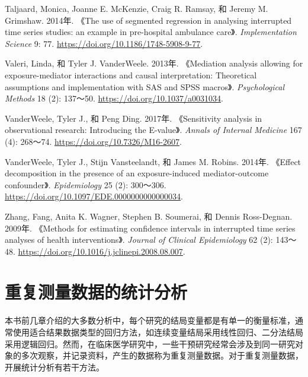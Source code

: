 \documentclass[
  chinese-hans,
  letterpaper,
  DIV=11,
  numbers=noendperiod]{scrreprt}
\newlength{\cslhangindent}
\newenvironment{CSLReferences}[2] %
 {\begin{list}{}{%
  \setlength{\itemindent}{0pt}
  \setlength{\leftmargin}{0pt}
  \setlength{\parsep}{0pt}
  \ifodd #1
   \setlength{\leftmargin}{\cslhangindent}
   \setlength{\itemindent}{-1\cslhangindent}
  \fi
  \setlength{\itemsep}{#2\baselineskip}}}
 {\end{list}}
\begin{document}
\begin{CSLReferences}{1}{1}
Taljaard, Monica, Joanne E. McKenzie, Craig R. Ramsay, 和 Jeremy M.
Grimshaw. 2014年. {《The use of segmented regression in analysing
interrupted time series studies: an example in pre-hospital ambulance
care》}. \emph{Implementation Science} 9: 77.
\url{https://doi.org/10.1186/1748-5908-9-77}.

Valeri, Linda, 和 Tyler J. VanderWeele. 2013年. {《Mediation analysis
allowing for exposure-mediator interactions and causal interpretation:
Theoretical assumptions and implementation with {SAS} and {SPSS}
macros》}. \emph{Psychological Methods} 18 (2): 137～50.
\url{https://doi.org/10.1037/a0031034}.

VanderWeele, Tyler J., 和 Peng Ding. 2017年. {《Sensitivity analysis in
observational research: Introducing the {E}-value》}. \emph{Annals of
Internal Medicine} 167 (4): 268～74.
\url{https://doi.org/10.7326/M16-2607}.

VanderWeele, Tyler J., Stijn Vansteelandt, 和 James M. Robins. 2014年.
{《Effect decomposition in the presence of an exposure-induced
mediator-outcome confounder》}. \emph{Epidemiology} 25 (2): 300～306.
\url{https://doi.org/10.1097/EDE.0000000000000034}.

Zhang, Fang, Anita K. Wagner, Stephen B. Soumerai, 和 Dennis
Ross-Degnan. 2009年. {《Methods for estimating confidence intervals in
interrupted time series analyses of health interventions》}.
\emph{Journal of Clinical Epidemiology} 62 (2): 143～48.
\url{https://doi.org/10.1016/j.jclinepi.2008.08.007}.

\end{CSLReferences}


\chapter{重复测量数据的统计分析}\label{ux91cdux590dux6d4bux91cfux6570ux636eux7684ux7edfux8ba1ux5206ux6790}

本书前几章介绍的大多数分析中，每个研究的结局变量都是有单一的衡量标准，通常使用适合结果数据类型的回归方法，如连续变量结局采用线性回归、二分法结局采用逻辑回归。然而，在临床医学研究中，一些干预研究经常会涉及到同一研究对象的多次观察，并记录资料，产生的数据称为重复测量数据。对于重复测量数据，开展统计分析有若干方法。
\end{document}
